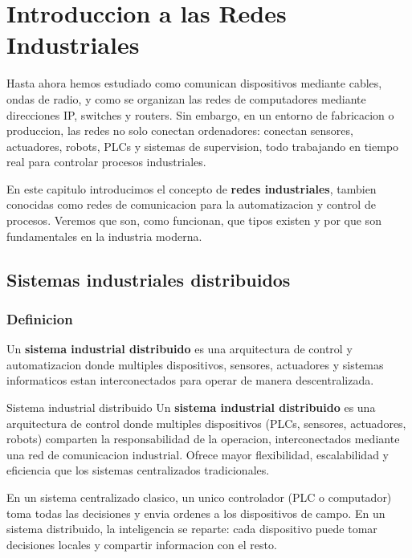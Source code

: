 
\chapter{Introduccion a las Redes Industriales}

Hasta ahora hemos estudiado como comunican dispositivos mediante cables, ondas
de radio, y como se organizan las redes de computadores mediante direcciones IP,
switches y routers. Sin embargo, en un entorno de fabricacion o produccion, las
redes no solo conectan ordenadores: conectan sensores, actuadores, robots, PLCs
y sistemas de supervision, todo trabajando en tiempo real para controlar procesos
industriales.

En este capitulo introducimos el concepto de \textbf{redes industriales}, tambien
conocidas como redes de comunicacion para la automatizacion y control de
procesos. Veremos que son, como funcionan, que tipos existen y por que son
fundamentales en la industria moderna.


\section{Sistemas industriales distribuidos}

\subsection{Definicion}

Un \textbf{sistema industrial distribuido} es una arquitectura de control y
automatizacion donde multiples dispositivos, sensores, actuadores y sistemas
informaticos estan interconectados para operar de manera descentralizada.

\begin{definicion}{Sistema industrial distribuido}
Un \textbf{sistema industrial distribuido} es una arquitectura de control donde
multiples dispositivos (PLCs, sensores, actuadores, robots) comparten la
responsabilidad de la operacion, interconectados mediante una red de
comunicacion industrial. Ofrece mayor flexibilidad, escalabilidad y eficiencia
que los sistemas centralizados tradicionales.
\end{definicion}

En un sistema centralizado clasico, un unico controlador (PLC o computador)
toma todas las decisiones y envia ordenes a los dispositivos de campo. En un
sistema distribuido, la inteligencia se reparte: cada dispositivo puede tomar
decisiones locales y compartir informacion con el resto.


